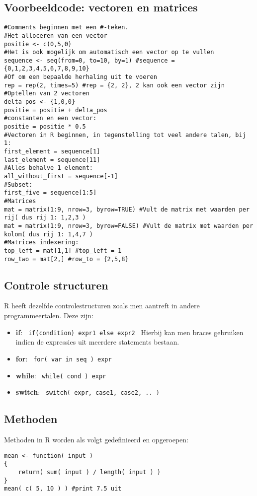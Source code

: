 \subsection{Voorbeeldcode: vectoren en matrices}
\begin{verbatim}
#Comments beginnen met een #-teken.
#Het alloceren van een vector
positie <- c(0,5,0)
#Het is ook mogelijk om automatisch een vector op te vullen
sequence <- seq(from=0, to=10, by=1) #sequence = {0,1,2,3,4,5,6,7,8,9,10}
#Of om een bepaalde herhaling uit te voeren
rep = rep(2, times=5) #rep = {2, 2}, 2 kan ook een vector zijn
#Optellen van 2 vectoren
delta_pos <- {1,0,0}
positie = positie + delta_pos
#constanten en een vector:
positie = positie * 0.5
#Vectoren in R beginnen, in tegenstelling tot veel andere talen, bij 1:
first_element = sequence[1]
last_element = sequence[11]
#Alles behalve 1 element:
all_without_first = sequence[-1]
#Subset:
first_five = sequence[1:5]
#Matrices
mat = matrix(1:9, nrow=3, byrow=TRUE) #Vult de matrix met waarden per rij( dus rij 1: 1,2,3 )
mat = matrix(1:9, nrow=3, byrow=FALSE) #Vult de matrix met waarden per kolom( dus rij 1: 1,4,7 )
#Matrices indexering:
top_left = mat[1,1] #top_left = 1
row_two = mat[2,] #row_to = {2,5,8}
\end{verbatim}
\subsection{Controle structuren}
R heeft dezelfde controlestructuren zoals men aantreft in andere programmeertalen. Deze zijn:
\begin{itemize}
\item \textbf{if}: \texttt{ if(condition) expr1 else expr2 } Hierbij kan men braces gebruiken indien de expressies uit meerdere statements bestaan. 
\item \textbf{for}: \texttt{ for( var in seq ) expr }
\item \textbf{while}: \texttt{ while( cond ) expr }
\item \textbf{switch}: \texttt{ switch( expr, case1, case2, .. ) }
\end{itemize}
\newpage
\subsection{Methoden}
Methoden in R worden als volgt gedefinieerd en opgeroepen: 
\begin{verbatim}
mean <- function( input )
{
	return( sum( input ) / length( input ) )
}
mean( c( 5, 10 ) ) #print 7.5 uit
\end{verbatim}
